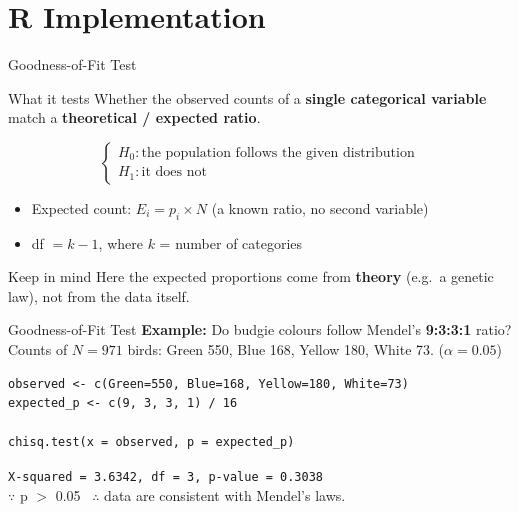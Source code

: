 \documentclass{beamer}					%
\begin{document}
\section{R Implementation}

\begin{frame}{Goodness-of-Fit Test}
\small
\begin{block}{What it tests}
Whether the observed counts of a \textbf{single categorical variable} match a
\textbf{theoretical / expected ratio}.
\end{block}

\vspace{0.5em}
$$
\begin{cases}
H_0: \text{the population follows the given distribution} \\
H_1: \text{it does not}
\end{cases}
$$

\begin{itemize}
    \item Expected count: $E_i = p_i \times N$ (a known ratio, no second variable)
    \item df $= k - 1$, where $k$ = number of categories
\end{itemize}

\vspace{0.8em}
\begin{alertblock}{Keep in mind}
Here the expected proportions come from \textbf{theory} (e.g.\ a genetic law),
not from the data itself.
\end{alertblock}

\end{frame}


\begin{frame}[fragile]{Goodness-of-Fit Test}
\small
\textbf{Example:} Do budgie colours follow Mendel's \textbf{9:3:3:1} ratio? \\
Counts of $N = 971$ birds: Green 550, Blue 168, Yellow 180, White 73. ($\alpha=0.05$)

\begin{lstlisting}
observed <- c(Green=550, Blue=168, Yellow=180, White=73)
expected_p <- c(9, 3, 3, 1) / 16  

chisq.test(x = observed, p = expected_p)
\end{lstlisting}

\vspace{0.3em}
\texttt{X-squared = 3.6342, df = 3, p-value = 0.3038} \\
\vspace{0.3em}
$\because$ p $>$ 0.05 \ $\therefore$ data are consistent with Mendel's laws.

\end{frame}
\end{document}
